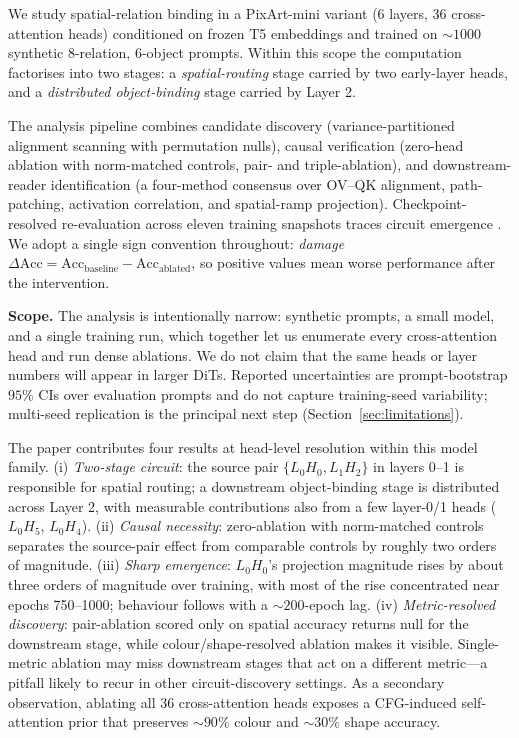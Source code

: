 \documentclass{article}
\begin{document}
We study spatial-relation binding in a PixArt-mini variant (6 layers, 36 cross-attention heads) conditioned on frozen T5 embeddings and trained on $\sim\!1000$ synthetic 8-relation, 6-object prompts. Within this scope the computation factorises into two stages: a \emph{spatial-routing} stage carried by two early-layer heads, and a \emph{distributed object-binding} stage carried by Layer 2.

The analysis pipeline combines candidate discovery (variance-partitioned alignment scanning with permutation nulls), causal verification (zero-head ablation with norm-matched controls, pair- and triple-ablation), and downstream-reader identification (a four-method consensus over OV--QK alignment, path-patching, activation correlation, and spatial-ramp projection). Checkpoint-resolved re-evaluation across eleven training snapshots traces circuit emergence \citep{nanda2023progress,olsson2022induction,power2022grokking}. We adopt a single sign convention throughout: \emph{damage} $\Delta\mathrm{Acc} = \mathrm{Acc}_{\mathrm{baseline}} - \mathrm{Acc}_{\mathrm{ablated}}$, so positive values mean worse performance after the intervention.

\textbf{Scope.} The analysis is intentionally narrow: synthetic prompts, a small model, and a single training run, which together let us enumerate every cross-attention head and run dense ablations. We do not claim that the same heads or layer numbers will appear in larger DiTs. Reported uncertainties are prompt-bootstrap $95\%$ CIs over evaluation prompts and do not capture training-seed variability; multi-seed replication is the principal next step (Section~\ref{sec:limitations}).

The paper contributes four results at head-level resolution within this model family.
(i) \emph{Two-stage circuit}: the source pair $\{L_0H_0, L_1H_2\}$ in layers 0--1 is responsible for spatial routing; a downstream object-binding stage is distributed across Layer 2, with measurable contributions also from a few layer-0/1 heads ($L_0H_5$, $L_0H_4$).
(ii) \emph{Causal necessity}: zero-ablation with norm-matched controls separates the source-pair effect from comparable controls by roughly two orders of magnitude.
(iii) \emph{Sharp emergence}: $L_0H_0$'s projection magnitude rises by about three orders of magnitude over training, with most of the rise concentrated near epochs 750--1000; behaviour follows with a $\sim\!200$-epoch lag.
(iv) \emph{Metric-resolved discovery}: pair-ablation scored only on spatial accuracy returns null for the downstream stage, while colour/shape-resolved ablation makes it visible. Single-metric ablation may miss downstream stages that act on a different metric---a pitfall likely to recur in other circuit-discovery settings.
As a secondary observation, ablating all 36 cross-attention heads exposes a CFG-induced self-attention prior that preserves $\sim\!90\%$ colour and $\sim\!30\%$ shape accuracy.
\end{document}
